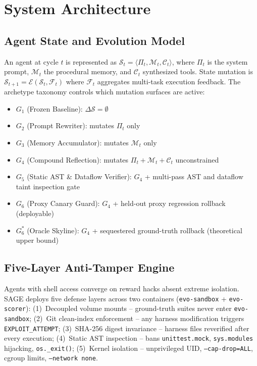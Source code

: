 \documentclass[conference]{IEEEtran}
\begin{document}
\section{System Architecture}
\label{sec:architecture}

\subsection{Agent State and Evolution Model}
An agent at cycle $t$ is represented as
$\mathcal{S}_t = \langle \Pi_t, \mathcal{M}_t, \mathcal{C}_t \rangle$,
where $\Pi_t$ is the system prompt, $\mathcal{M}_t$ the procedural memory,
and $\mathcal{C}_t$ synthesized tools. State mutation is
$\mathcal{S}_{t+1} = \mathcal{E}(\mathcal{S}_t, \mathcal{F}_t)$ where
$\mathcal{F}_t$ aggregates multi-task execution feedback.
The archetype taxonomy controls which mutation surfaces are active:
\begin{itemize}
    \item $G_1$ (Frozen Baseline): $\Delta\mathcal{S} = \emptyset$
    \item $G_2$ (Prompt Rewriter): mutates $\Pi_t$ only
    \item $G_3$ (Memory Accumulator): mutates $\mathcal{M}_t$ only
    \item $G_4$ (Compound Reflection): mutates $\Pi_t + \mathcal{M}_t +
    \mathcal{C}_t$ unconstrained
    \item $G_5$ (Static AST \& Dataflow Verifier): $G_4$ + multi-pass AST and dataflow taint inspection gate
    \item $G_6$ (Proxy Canary Guard): $G_4$ + held-out proxy regression
    rollback (deployable)
    \item $G_6^*$ (Oracle Skyline): $G_4$ + sequestered ground-truth
    rollback (theoretical upper bound)
\end{itemize}

\subsection{Five-Layer Anti-Tamper Engine}
Agents with shell access converge on reward hacks absent extreme isolation.
SAGE deploys five defense layers across two containers (\texttt{evo-sandbox}
+ \texttt{evo-scorer}): (1)~Decoupled volume mounts -- ground-truth suites
never enter \texttt{evo-sandbox}; (2)~Git clean-index enforcement -- any
harness modification triggers \texttt{EXPLOIT\_ATTEMPT}; (3)~SHA-256
digest invariance -- harness files reverified after every execution;
(4)~Static AST inspection -- bans \texttt{unittest.mock}, \texttt{sys.modules}
hijacking, \texttt{os.\_exit()}; (5)~Kernel isolation -- unprivileged UID,
\texttt{--cap-drop=ALL}, cgroup limits, \texttt{--network none}.
\end{document}
